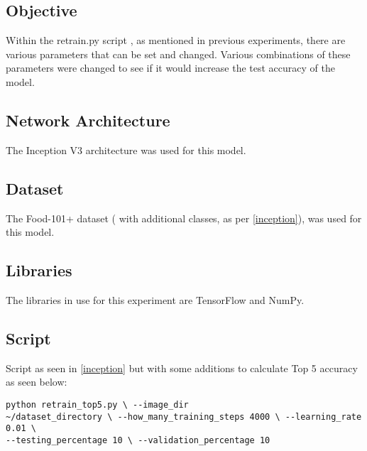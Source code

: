 \subsection*{Objective}
Within the retrain.py script \parencite{retrainInception}, as mentioned in
previous experiments, there are various parameters that can be set and changed.
Various combinations of these parameters were changed to see if it would increase the
test accuracy of the model.

\subsection*{Network Architecture}
The Inception V3 architecture was used for this model.

\subsection*{Dataset}
The Food-101+ dataset (\parencite{food101} with additional classes, as per
\ref{inception}), was used for this model.

\subsection*{Libraries}
The libraries in use for this experiment are TensorFlow and NumPy.

\subsection*{Script}
Script as seen in \ref{inception} but with some additions to calculate Top 5 accuracy as seen
below:

\begin{lstlisting}
python retrain_top5.py \ --image_dir
~/dataset_directory \ --how_many_training_steps 4000 \ --learning_rate 0.01 \
--testing_percentage 10 \ --validation_percentage 10
\end{lstlisting}

